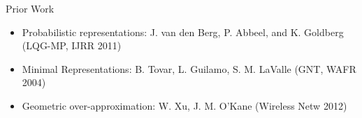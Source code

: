 \begin{frame}{Prior Work}
\begin{itemize}
\item Probabilistic representations: J. van den Berg,
  P. Abbeel, and K. Goldberg (LQG-MP, IJRR 2011)
\item Minimal Representations: B. Tovar, L. Guilamo, S. M. LaValle (GNT, WAFR 2004)
\item Geometric over-approximation: W. Xu, J. M. O'Kane (Wireless Netw 2012)
\end{itemize}

\end{frame}